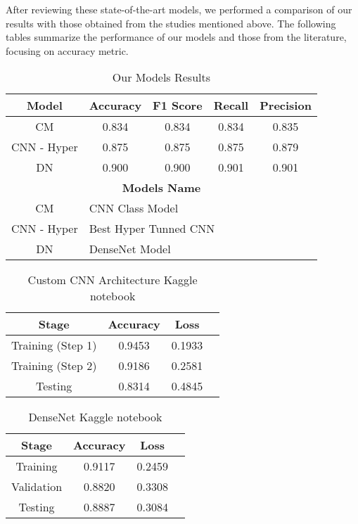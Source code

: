 After reviewing these state-of-the-art models, we performed a comparison of our results with those obtained from the studies mentioned above. The following tables summarize the performance of our models and those from the literature, focusing on accuracy metric.

\begin{table}[H]
    \centering
    \caption{Our Models Results} 
    \begin{tabular}{||c|c|c|c|c||} 
     \hline    
     \textbf{Model} & \textbf{Accuracy} & \textbf{F1 Score} & \textbf{Recall} & \textbf{Precision} \\
     \hline \hline
     CM & 0.834 & 0.834 & 0.834 & 0.835 \\
     \hline
    CNN - Hyper & 0.875 & 0.875 & 0.875 & 0.879 \\
     \hline
     DN & 0.900 & 0.900 & 0.901 & 0.901 \\
     \hline 

\hline
     \multicolumn{5}{||c||}{\textbf{Models Name}} \\
     \hline
     CM & \multicolumn{4}{|l||}{CNN Class Model} \\ 
     \hline
    CNN - Hyper & \multicolumn{4}{|l||}{Best Hyper Tunned CNN} \\ 
     \hline
     DN & \multicolumn{4}{|l||}{DenseNet Model} \\ 
\hline

    \end{tabular}
    \label{tab:tab_Final}
\end{table}


\begin{table}[H]
    \centering
    \caption{Custom CNN Architecture Kaggle notebook\cite{kaggle2024intel}} 
    \begin{tabular}{||c|c|c|c||} 
     \hline    
     \textbf{Stage} & \textbf{Accuracy} & \textbf{Loss} \\
     \hline \hline
     Training (Step 1) & 0.9453 & 0.1933  \\
     \hline
     Training (Step 2) & 0.9186 & 0.2581 \\
     \hline
     Testing & 0.8314 & 0.4845 \\
     \hline
    \end{tabular}
    \label{tab:model_evaluation}
\end{table}

\begin{table}[H]
    \centering
    \caption{DenseNet Kaggle notebook\cite{kaggle2023densenet}}
    \begin{tabular}{||c|c|c|c||} 
     \hline    
     \textbf{Stage} & \textbf{Accuracy} & \textbf{Loss} \\
     \hline \hline
     Training  & 0.9117 & 0.2459  \\
     \hline
     Validation & 0.8820 & 0.3308\\
     \hline
     Testing & 0.8887 & 0.3084  \\

     \hline
    \end{tabular}
    \label{tab:model_evaluation_epoch17}
\end{table}


